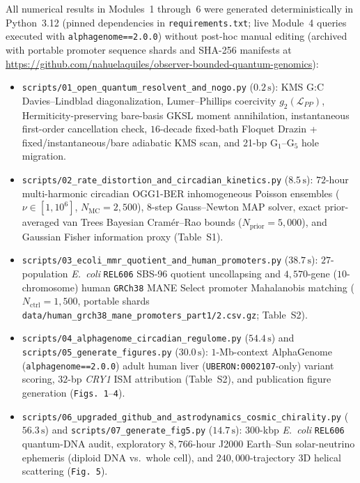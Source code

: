\documentclass[10pt,letterpaper]{article}
\newcommand{\Lcal}{\mathcal{L}}
\begin{document}
All numerical results in Modules~1 through~6 were generated deterministically in Python~3.12 (pinned dependencies in \texttt{requirements.txt}; live Module~4 queries executed with \texttt{alphagenome==2.0.0}) without post-hoc manual editing (archived with portable promoter sequence shards and SHA-256 manifests at \url{https://github.com/nahuelaquiles/observer-bounded-quantum-genomics}):
\begin{itemize}
    \item \texttt{scripts/01\_\allowbreak open\_\allowbreak quantum\_\allowbreak resolvent\_\allowbreak and\_\allowbreak nogo.py} ($0.2\,\mathrm{s}$): KMS G:C Davies--Lindblad diagonalization, Lumer--Phillips coercivity $g_2(\Lcal_{PP})$, Hermiticity-preserving bare-basis GKSL moment annihilation, instantaneous first-order cancellation check, $16$-decade fixed-bath Floquet Drazin + fixed/instantaneous/bare adiabatic KMS scan, and 21-bp $\mathrm{G}_1$--$\mathrm{G}_5$ hole migration.
    \item \texttt{scripts/02\_\allowbreak rate\_\allowbreak distortion\_\allowbreak and\_\allowbreak circadian\_\allowbreak kinetics.py} ($8.5\,\mathrm{s}$): $72$-hour multi-harmonic circadian OGG1-BER inhomogeneous Poisson ensembles ($\nu \in [1, 10^6]$, $N_{\mathrm{MC}} = 2{,}500$), $8$-step Gauss--Newton MAP solver, exact prior-averaged van Trees Bayesian Cram\'er--Rao bounds ($N_{\mathrm{prior}} = 5{,}000$), and Gaussian Fisher information proxy (Table~S1).
    \item \texttt{scripts/03\_\allowbreak ecoli\_\allowbreak mmr\_\allowbreak quotient\_\allowbreak and\_\allowbreak human\_\allowbreak promoters.py} ($38.7\,\mathrm{s}$): $27$-population \emph{E.\ coli} \texttt{REL606} SBS-96 quotient uncollapsing and $4{,}570$-gene ($10$-chromosome) human \texttt{GRCh38} MANE Select promoter Mahalanobis matching ($N_{\mathrm{ctrl}} = 1{,}500$, portable shards \texttt{data/human\_grch38\_mane\_promoters\_part1/2.csv.gz}; Table~S2).
    \item \texttt{scripts/04\_\allowbreak alphagenome\_\allowbreak circadian\_\allowbreak regulome.py} ($54.4\,\mathrm{s}$) and \texttt{scripts/05\_\allowbreak generate\_\allowbreak figures.py} ($30.0\,\mathrm{s}$): $1$-Mb-context AlphaGenome (\texttt{alphagenome==2.0.0}) adult human liver (\texttt{UBERON:0002107}-only) variant scoring, $32$-bp \emph{CRY1} ISM attribution (Table~S2), and publication figure generation (\texttt{Figs.~1}--\texttt{4}).
    \item \texttt{scripts/06\_\allowbreak upgraded\_\allowbreak github\_\allowbreak and\_\allowbreak astrodynamics\_\allowbreak cosmic\_\allowbreak chirality.py} ($56.3\,\mathrm{s}$) and \texttt{scripts/07\_\allowbreak generate\_\allowbreak fig5.py} ($14.7\,\mathrm{s}$): $300$-kbp \emph{E.\ coli} \texttt{REL606} quantum-DNA audit, exploratory $8{,}766$-hour J2000 Earth--Sun solar-neutrino ephemeris (diploid DNA vs.\ whole cell), and $240{,}000$-trajectory 3D helical scattering (\texttt{Fig.~5}).

\end{itemize}
\end{document}

